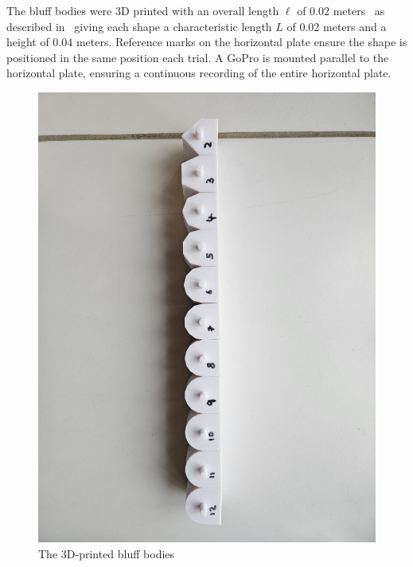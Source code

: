 The bluff bodies were 3D printed with an overall length $\ell$ of $0.02$ meters \textemdash\ as described in  \textemdash\ giving each shape a characteristic length $L$ of $0.02$ meters and a height of $0.04$ meters. Reference marks on the horizontal plate ensure the shape is positioned in the same position each trial. A GoPro is mounted parallel to the horizontal plate, ensuring a continuous recording of the entire horizontal plate.

\begin{figure}[H]
	\centering
	\includegraphics[width=\textwidth]{images/shapes.jpg}
	\caption{The 3D-printed bluff bodies}
	\label{fig:shapes}
\end{figure}


